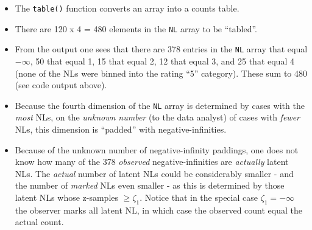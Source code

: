 \documentclass[
]{book}
\newenvironment{Shaded}{\begin{snugshade}}{\end{snugshade}}
\newcommand{\CommentTok}[1]{\textcolor[rgb]{0.56,0.35,0.01}{\textit{#1}}}
\newcommand{\DecValTok}[1]{\textcolor[rgb]{0.00,0.00,0.81}{#1}}
\newcommand{\KeywordTok}[1]{\textcolor[rgb]{0.13,0.29,0.53}{\textbf{#1}}}
\newcommand{\NormalTok}[1]{#1}
\newcommand{\OperatorTok}[1]{\textcolor[rgb]{0.81,0.36,0.00}{\textbf{#1}}}
\newcommand{\StringTok}[1]{\textcolor[rgb]{0.31,0.60,0.02}{#1}}
\providecommand{\tightlist}{%
  \setlength{\itemsep}{0pt}\setlength{\parskip}{0pt}}
\begin{document}
\begin{itemize}
\tightlist
\item
  The \texttt{table()} function converts an array into a counts table.
\item
  There are 120 x 4 = 480 elements in the \texttt{NL} array to be ``tabled''.
\item
  From the output one sees that there are 378 entries in the \texttt{NL} array that equal \(-\infty\), 50 that equal 1, 15 that equal 2, 12 that equal 3, and 25 that equal 4 (none of the NLs were binned into the rating ``5'' category). These sum to 480 (see code output above).
\item
  Because the fourth dimension of the \texttt{NL} array is determined by cases with the \emph{most} NLs, on the \emph{unknown number} (to the data analyst) of cases with \emph{fewer} NLs, this dimension is ``padded'' with negative-infinities.\\
\item
  Because of the unknown number of negative-infinity paddings, one does not know how many of the 378 \emph{observed} negative-infinities are \emph{actually} latent NLs. The \emph{actual} number of latent NLs could be considerably smaller - and the number of \emph{marked} NLs even smaller - as this is determined by those latent NLs whose z-samples \(\geq \zeta_1\). Notice that in the special case \(\zeta_1 = -\infty\) the observer marks all latent NL, in which case the observed count equal the actual count.
\end{itemize}

\begin{Shaded}
\end{Shaded}
\end{document}

